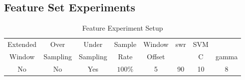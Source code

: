 




    
\subsection{Feature Set Experiments}
\label{sec:svm_feature_set_experiments}


\begin{table}[h]
\begin{center}

    \begin{tabular}{|c|c|c|c|c|c|cc|}
        \hline
        Extended & Over & Under & Sample & Window & \gls{swr} & SVM & \\
        Window & Sampling & Sampling & Rate & Offset &  & C & gamma \\ \hline
        No & No & Yes & $100\%$ & 5 & 90 & 10 & 8 \\ \hline
    \end{tabular}
    \caption{Feature Experiment Setup}
    \label{tab:svm_feature_experiment_setup}
\end{center}

\end{table}

